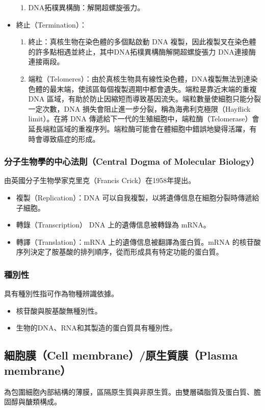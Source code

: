 \documentclass[a4paper,12pt]{report}
\begin{document}
\begin{itemize}
\begin{enumerate}[label=\Roman*.]
    \item DNA拓樸異構酶：解開超螺旋張力。
    \end{enumerate}
    \item 終止（Termination）：
    \begin{enumerate}[label=\Roman*.]
    \item 終止：真核生物在染色體的多個點啟動 DNA 複製，因此複製叉在染色體的許多點相遇並終止，其中DNA拓樸異構酶解開超螺旋張力 DNA連接酶連接兩段。
    \item 端粒（Telomeres）：由於真核生物具有線性染色體，DNA複製無法到達染色體的最末端，使該區每個複製週期中都會遺失。端粒是靠近末端的重複 DNA 區域，有助於防止因縮短而導致基因流失。端粒數量使細胞只能分裂一定次數，DNA 損失會阻止進一步分裂，稱為海弗利克極限（Hayflick limit）。在將 DNA 傳遞給下一代的生殖細胞中，端粒酶（Telomerase）會延長端粒區域的重複序列。端粒酶可能會在體細胞中錯誤地變得活躍，有時會導致癌症的形成。
    \end{enumerate}
\end{itemize}
\subsubsection{分子生物學的中心法則（Central Dogma of Molecular Biology）}
由英國分子生物學家克里克（Francis Crick）在1958年提出。
\begin{itemize}
\item 複製（Replication）：DNA 可以自我複製，以將遺傳信息在細胞分裂時傳遞給子細胞。
\item 轉錄（Transcription）
DNA 上的遺傳信息被轉錄為 mRNA。
\item 轉譯（Translation）：mRNA 上的遺傳信息被翻譯為蛋白質。mRNA 的核苷酸序列決定了胺基酸的排列順序，從而形成具有特定功能的蛋白質。
\end{itemize}
\subsubsection{種別性}
具有種別性指可作為物種辨識依據。
\begin{itemize}
  \item 核苷酸與胺基酸無種別性。
  \item 生物的DNA、RNA和其製造的蛋白質具有種別性。
\end{itemize}
\subsection{細胞膜（Cell membrane）/原生質膜（Plasma membrane）}
\bct\bfH\ctr{}\ef\FB\ect
為包圍細胞內部結構的薄膜，區隔原生質與非原生質。由雙層磷脂質及蛋白質、膽固醇與醣類構成。
\end{document}
